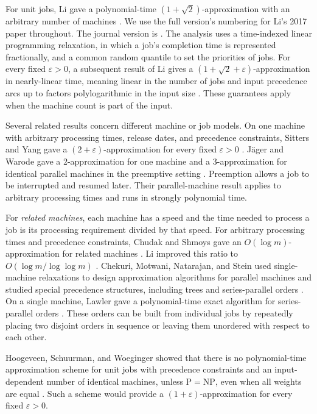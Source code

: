 For unit jobs, Li gave a polynomial-time $(1+\sqrt2)$-approximation
with an arbitrary number of machines \cite[Theorem~1.2 and Section~3 of the full version]{Li2017}.
We use the full version's numbering for Li's 2017 paper throughout. The journal
version is \cite{Li2020}.
The analysis uses a time-indexed linear programming relaxation, in which
a job's completion time is represented fractionally, and a common random
quantile to set the priorities of jobs. For every fixed $\varepsilon>0$, a subsequent result of Li gives a
$(1+\sqrt2+\varepsilon)$-approximation in nearly-linear time,
meaning linear in the number of jobs and input precedence arcs up to
factors polylogarithmic in the input size
\cite[Theorem~1.5]{Li2023}. These guarantees apply when the machine count
is part of the input.

Several related results concern different machine or job models. On one
machine with arbitrary processing times, release dates, and precedence
constraints, Sitters and Yang gave a $(2+\varepsilon)$-approximation for
every fixed $\varepsilon>0$ \cite{SittersYang2018}. J\"ager and Warode gave
a 2-approximation for one machine and a 3-approximation for identical
parallel machines in the preemptive setting \cite{JaegerWarode2024}.
Preemption allows a job to be interrupted and resumed later. Their
parallel-machine result applies to arbitrary processing times and runs in
strongly polynomial time.

For \emph{related machines}, each machine has a speed and the time needed to
process a job is its processing requirement divided by that speed.
For arbitrary processing times and precedence constraints, Chudak and Shmoys
gave an $O(\log m)$-approximation for related machines \cite{ChudakShmoys1999}.
Li improved this ratio to $O(\log m/\log\log m)$
\cite[Theorem~1.3 of the full version]{Li2017}. Chekuri, Motwani,
Natarajan, and Stein used single-machine relaxations to design approximation
algorithms for parallel machines and studied special precedence structures,
including trees and series-parallel orders \cite{ChekuriEtAl2001}. On a single
machine, Lawler gave a polynomial-time exact algorithm for series-parallel
orders \cite{Lawler1978}. These orders can be built from individual jobs by
repeatedly placing two disjoint orders in sequence or leaving them unordered
with respect to each other.

Hoogeveen, Schuurman, and Woeginger showed that there is no polynomial-time
approximation scheme for unit jobs with precedence constraints and an
input-dependent number of identical machines, unless $\mathrm{P}=\mathrm{NP}$,
even when all weights are equal \cite{HoogeveenEtAl2001}. Such a scheme would
provide a $(1+\varepsilon)$-approximation for every fixed $\varepsilon>0$.


